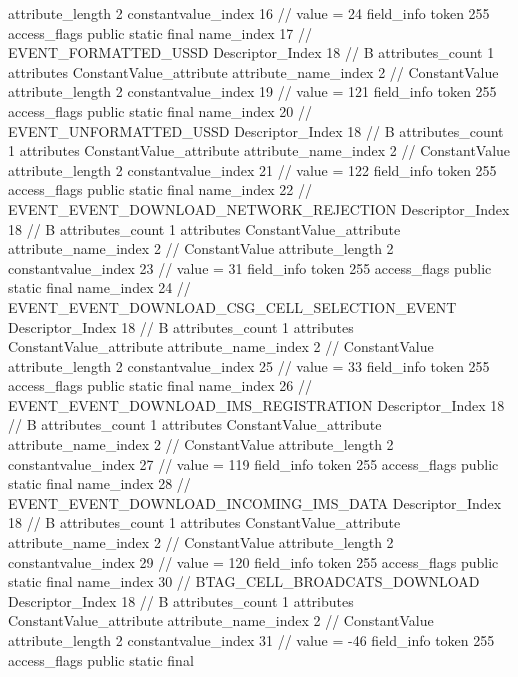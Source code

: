 {{{{{{{					attribute_length	2
					constantvalue_index	16		// value = 24
				}
				}
			}
			field_info {
				token	255
				access_flags	public static final
				name_index	17		// EVENT_FORMATTED_USSD
				Descriptor_Index	18		// B
				attributes_count	1
				attributes {
				ConstantValue_attribute {
					attribute_name_index	2		// ConstantValue
					attribute_length	2
					constantvalue_index	19		// value = 121
				}
				}
			}
			field_info {
				token	255
				access_flags	public static final
				name_index	20		// EVENT_UNFORMATTED_USSD
				Descriptor_Index	18		// B
				attributes_count	1
				attributes {
				ConstantValue_attribute {
					attribute_name_index	2		// ConstantValue
					attribute_length	2
					constantvalue_index	21		// value = 122
				}
				}
			}
			field_info {
				token	255
				access_flags	public static final
				name_index	22		// EVENT_EVENT_DOWNLOAD_NETWORK_REJECTION
				Descriptor_Index	18		// B
				attributes_count	1
				attributes {
				ConstantValue_attribute {
					attribute_name_index	2		// ConstantValue
					attribute_length	2
					constantvalue_index	23		// value = 31
				}
				}
			}
			field_info {
				token	255
				access_flags	public static final
				name_index	24		// EVENT_EVENT_DOWNLOAD_CSG_CELL_SELECTION_EVENT
				Descriptor_Index	18		// B
				attributes_count	1
				attributes {
				ConstantValue_attribute {
					attribute_name_index	2		// ConstantValue
					attribute_length	2
					constantvalue_index	25		// value = 33
				}
				}
			}
			field_info {
				token	255
				access_flags	public static final
				name_index	26		// EVENT_EVENT_DOWNLOAD_IMS_REGISTRATION
				Descriptor_Index	18		// B
				attributes_count	1
				attributes {
				ConstantValue_attribute {
					attribute_name_index	2		// ConstantValue
					attribute_length	2
					constantvalue_index	27		// value = 119
				}
				}
			}
			field_info {
				token	255
				access_flags	public static final
				name_index	28		// EVENT_EVENT_DOWNLOAD_INCOMING_IMS_DATA
				Descriptor_Index	18		// B
				attributes_count	1
				attributes {
				ConstantValue_attribute {
					attribute_name_index	2		// ConstantValue
					attribute_length	2
					constantvalue_index	29		// value = 120
				}
				}
			}
			field_info {
				token	255
				access_flags	public static final
				name_index	30		// BTAG_CELL_BROADCATS_DOWNLOAD
				Descriptor_Index	18		// B
				attributes_count	1
				attributes {
				ConstantValue_attribute {
					attribute_name_index	2		// ConstantValue
					attribute_length	2
					constantvalue_index	31		// value = -46
				}
				}
			}
			field_info {
				token	255
				access_flags	public static final
}}}}}
